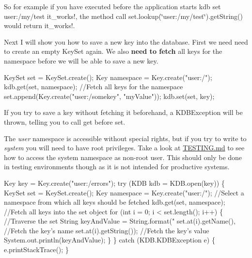 So for example if you have executed before the application starts {\ttfamily kdb set user\+:/my/test it\+\_\+works!}, the method call {\ttfamily set.\+lookup(\char`\"{}user\+:/my/test\char`\"{}).get\+String()} would return {\ttfamily it\+\_\+works!}.

Next I will show you how to save a new key into the database. First we need need to create an empty {\ttfamily Key\+Set} again. We also {\bfseries need to fetch} all keys for the namespace before we will be able to save a new key.


\begin{DoxyCode}
KeySet \textcolor{keyword}{set} = KeySet.create();
Key \textcolor{keyword}{namespace }= Key.create("user:/");
kdb.get(set, namespace);    \textcolor{comment}{//Fetch all keys for the namespace}
set.append(Key.create("user:/somekey", "myValue"));
kdb.set(set, key);
\end{DoxyCode}


If you try to save a key without fetching it beforehand, a {\ttfamily K\+D\+B\+Exception} will be thrown, telling you to call get before set.

The {\itshape user} namespace is accessible without special rights, but if you try to write to {\itshape system} you will need to have root privileges. Take a look at \hyperlink{doc_TESTING_md}{T\+E\+S\+T\+I\+NG.md} to see how to access the system namespace as non-\/root user. This should only be done in testing environments though as it is not intended for productive systems.


\begin{DoxyCode}
Key key = Key.create(\textcolor{stringliteral}{"user:/errors"});
\textcolor{keywordflow}{try} (KDB kdb = KDB.open(key)) \{
    KeySet \textcolor{keyword}{set} = KeySet.create();
    Key \textcolor{keyword}{namespace }= Key.create("user:/");       \textcolor{comment}{//Select a namespace from which all keys should be fetched}
    kdb.get(set, namespace);                  \textcolor{comment}{//Fetch all keys into the set object}
    for (int i = 0; i < set.length(); i++) \{  \textcolor{comment}{//Traverse the set}
        String keyAndValue = String.format("%
                set.at(i).getName(),          \textcolor{comment}{//Fetch the key's name}
                set.at(i).getString());       \textcolor{comment}{//Fetch the key's value}
        System.out.println(keyAndValue);
    \}
\} catch (KDB.KDBException e) \{
    e.printStackTrace();
\}
\end{DoxyCode}


